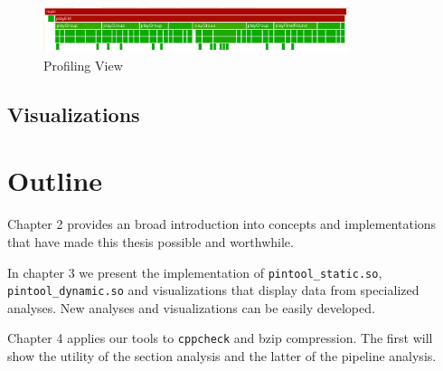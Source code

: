 \begin{figure}[!ht]
	\centering
	\includegraphics[width=0.8\textwidth]{profiling}
	\caption{Profiling View}
	\label{cap1:profiling}
\end{figure}

\subsection {Visualizations}

\section {Outline}

Chapter 2 provides an broad introduction into concepts and implementations that have made this thesis possible and worthwhile.

In chapter 3 we present the implementation of \texttt{pintool\_static.so}, \texttt{pintool\_dynamic.so} and visualizations that display data from specialized analyses. New analyses and visualizations can be easily developed.

Chapter 4 applies our tools to \texttt{cppcheck} \cite{cppcheck} and bzip \cite{bzip} compression. The first will show the utility of the section analysis and the latter of the pipeline analysis.